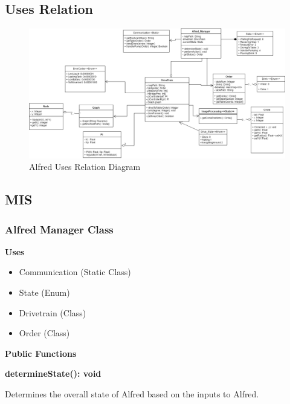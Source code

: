 \documentclass [10pt]{article}
\begin{document}

\subsection{Uses Relation}
\begin{figure} [h!]
	\centering
	\includegraphics [scale = 0.38] {figures/Alfred_UsesDiagram.png}
	\caption{Alfred Uses Relation Diagram}
\end{figure}


\subsection{MIS}


\subsubsection{Alfred Manager Class}

\textbf{Uses}
\begin{itemize}
	\item Communication (Static Class)
	\item State (Enum)
	\item Drivetrain (Class)
	\item Order (Class)
\end{itemize}

\textbf{Public Functions}

\textbf{determineState(): void}

Determines the overall state of Alfred based on the inputs to Alfred. 
\end{document}
